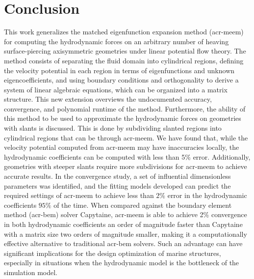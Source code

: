 \documentclass[lineno]{JFM-FLM_Au}
\begin{document}
\section{Conclusion}\label{jfm:sec:conclusion}
This work generalizes the matched eigenfunction expansion method (\gls{acr-meem}) for computing the hydrodynamic forces on an arbitrary number of heaving surface-piercing axisymmetric geometries under linear potential flow theory.
The method consists of separating the fluid domain into cylindrical regions, defining the velocity potential in each region in terms of eigenfunctions and unknown eigencoefficients, and using boundary conditions and orthogonality to derive a system of linear algebraic equations, which can be organized into a matrix structure.
This new extension overviews the undocumented accuracy, convergence, and polynomial runtime of the method.
Furthermore, the ability of this method to be used to approximate the hydrodynamic forces on geometries with slants is discussed.
This is done by subdividing slanted regions into cylindrical regions that can be \modelled{} through \gls{acr-meem}. We have found that, while the velocity potential computed from \gls{acr-meem} may have inaccuracies locally, the hydrodynamic coefficients can be computed with less than 5\% error.
Additionally, geometries with steeper slants require more subdivisions for \gls{acr-meem} to achieve accurate results.
In the convergence study, a set of influential dimensionless parameters was identified, and the fitting models developed can predict the required settings of \gls{acr-meem} to achieve less than $2\%$ error in the hydrodynamic coefficients $95\%$ of the time.
When compared against the boundary element method (\gls{acr-bem}) solver Capytaine, \gls{acr-meem} is able to achieve 2\% convergence in both hydrodynamic coefficients an order of magnitude faster than Capytaine with a matrix size two orders of magnitude smaller, making it a computationally effective alternative to traditional \gls{acr-bem} solvers.
Such an advantage can have significant implications for the design optimization of marine structures, especially in situations when the hydrodynamic model is the bottleneck of the simulation model. 
\end{document}
